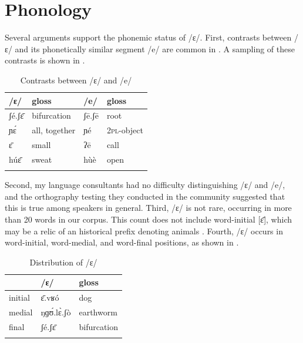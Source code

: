 \documentclass[output=paper,colorlinks,citecolor=brown]{langscibook}
\begin{document}
\section{Phonology}\label{sec:olson:2}

Several arguments support the phonemic status of /ɛ/. First, contrasts between /ɛ/ and its phonetically similar segment /e/ are common in . A sampling of these contrasts is shown in .

\begin{table}
\caption{Contrasts between /ɛ/ and /e/}
\label{tab:olson:4}
    \begin{tabular}{llll}
    \lsptoprule
        /ɛ/ & gloss & /e/  & gloss\\
    \midrule
        ʃé.ʃɛ̄ & bifurcation & ʃē.ʃē & root\\
        ɲɛ́  & all, together & ɲé    & \textsc{2pl}-object\\
        ɛ̄     & small       & ʔē    & call\\
        húɛ̄   & sweat       & hùè   & open\\
    \lspbottomrule
    \end{tabular}
\end{table}

Second, my language consultants had no difficulty distinguishing /ɛ/ and /e/, and the orthography testing they conducted in the  community suggested that this is true among  speakers in general. Third, /ɛ/ is not rare, occurring in more than 20 words in our corpus. This count does not include word-initial [ɛ̄], which may be a relic of an historical prefix denoting animals \citep[13]{Greenberg1970}. Fourth, /ɛ/ occurs in word-initial, word-medial, and word-final positions, as shown in .

\begin{table}
\caption{Distribution of /ɛ/}
\label{tab:olson:5}
    \begin{tabular}{lll}
    \lsptoprule
                    & /ɛ/ & gloss\\
    \midrule
        initial     & ɛ̄.vʁó & dog\\
        medial      & ŋɡʊ́.lɛ̀.ʃò  & earthworm\\
        final       & ʃé.ʃɛ̄   & bifurcation\\
    \lspbottomrule
 \end{tabular}
\end{table}
\end{document}
